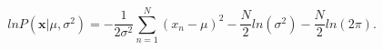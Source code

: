 \begin{equation}
\label{eq:loglikelihoodgaussian}
ln P(\mathbf{x} | \mu, \sigma^2) = - \frac{1}{2 \sigma^2} \sum_{n = 1}^{N}{(x_n
- \mu)^2} - \frac{N}{2} ln (\sigma^2) - \frac{N}{2} ln (2 \pi) .
\end{equation}